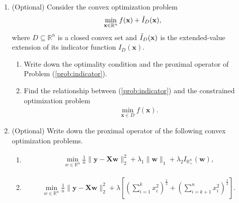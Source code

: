 \documentclass[11pt,letter,notitlepage]{article}
\begin{document}
\begin{exercise}
\begin{enumerate}[resume]
    \item (Optional) Consider the convex optimization problem
    \begin{align}\label{prob:indicator}
        \min_{\textbf{x}\in\mathbb{R}^n} f(\textbf{x})+\Tilde{I}_D(\textbf{x}),
    \end{align}
    where $D\subseteq\mathbb{R}^n$ is a closed convex set and $\Tilde{I}_D(\textbf{x})$ is the extended-value extension of its indicator function $I_D(\textbf{x})$. 
    \begin{enumerate}
        \item Write down the optimality condition and the proximal operator of Problem (\ref{prob:indicator}).
        \item Find the relationship between (\ref{prob:indicator}) and the constrained optimization problem
        \begin{align*}
        \min_{\textbf{x}\in D} f(\textbf{x}).
        \end{align*}
    \end{enumerate}
     
    
    \item (Optional) Write down the proximal operator of the following convex optimization problems.
    \begin{enumerate}
        \item 
        \begin{align*}
        \min_{w\in\mathbb{R}^n} \frac{1}{n}\|\textbf{y}-\textbf{X}\textbf{w}\|_2^2+\lambda_1 \|\textbf{w}\|_1+\lambda_2 I_{\mathbb{R}^n_+}(\textbf{w}),
        \end{align*}
        
        \item 
        \begin{align*}
        \min_{w\in\mathbb{R}^n} \frac{1}{n}\|\textbf{y}-\textbf{X}\textbf{w}\|_2^2+\lambda \left[\left(\sum\limits_{i=1}^k x_i^2\right)^{\frac{1}{2}}+\left(\sum\limits_{i=k+1}^n x_i^2\right)^{\frac{1}{2}}\right].
        \end{align*}
    \end{enumerate}
    
\end{enumerate}

\end{exercise}
\begin{solution}

\end{solution}
\end{document}
